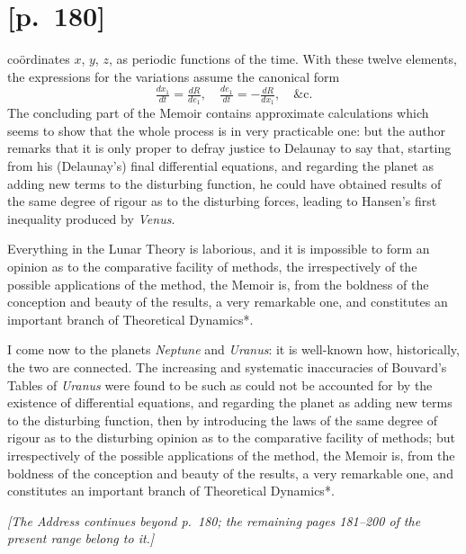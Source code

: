 \documentclass[11pt]{article}
\begin{document}
\section*{[p.~180]}
co\"ordinates $x$, $y$, $z$, as periodic functions of the time. With these twelve elements, the
expressions for the variations assume the canonical form
\[
\tfrac{dx_1}{dt}=\tfrac{dR}{de_1},\quad \tfrac{de_1}{dt}=-\tfrac{dR}{dx_1},\quad \&\text{c.}
\]
The concluding part of the Memoir contains approximate calculations which seems
to show that the whole process is in very practicable one: but the author remarks that
it is only proper to defray justice to Delaunay to say that, starting from his (Delaunay's) final
differential equations, and regarding the planet as adding new terms to the disturbing
function, he could have obtained results of the same degree of rigour as to the disturbing
forces, leading to Hansen's first inequality produced by \textit{Venus}.

Everything in the Lunar Theory is laborious, and it is impossible to form an
opinion as to the comparative facility of methods, the irrespectively of the possible
applications of the method, the Memoir is, from the boldness of the conception and
beauty of the results, a very remarkable one, and constitutes an important branch of
Theoretical Dynamics*.

I come now to the planets \textit{Neptune} and \textit{Uranus}: it is well-known how, historically,
the two are connected. The increasing and systematic inaccuracies of Bouvard's Tables
of \textit{Uranus} were found to be such as could not be accounted for by the existence of
differential equations, and regarding the planet as adding new terms to the disturbing
function, then by introducing the laws of the same degree of rigour as to the disturbing
opinion as to the comparative facility of methods; but irrespectively of the possible
applications of the method, the Memoir is, from the boldness of the conception and
beauty of the results, a very remarkable one, and constitutes an important branch of
Theoretical Dynamics*.

\bigskip
\noindent\textit{[The Address continues beyond p.~180; the remaining pages 181--200 of the
present range belong to it.]}
\end{document}
